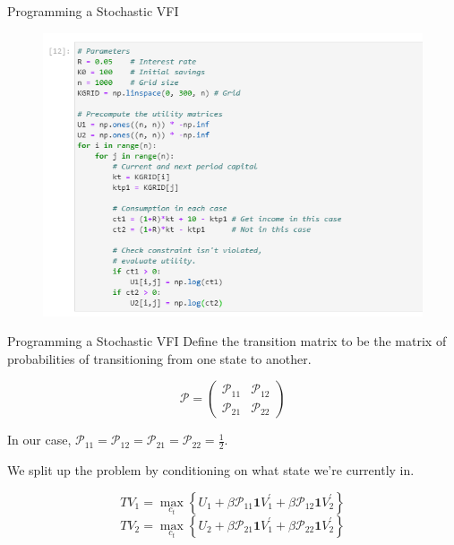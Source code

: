 \documentclass[11pt, xcolor={dvipsnames}, hyperref={colorlinks, allcolors=Blue}]{beamer}
\begin{document}
\begin{frame}{Programming a Stochastic VFI}

\begin{figure}
	\includegraphics[height=0.8\paperheight]{Code5.png}
	\hfill
\end{figure}

\end{frame}

\begin{frame}{Programming a Stochastic VFI}
Define the transition matrix to be the matrix of probabilities of transitioning from one state to another.

\[\mathcal{P} = \begin{pmatrix}\mathcal{P}_{11} & \mathcal{P}_{12}\\ \mathcal{P}_{21} & \mathcal{P}_{22} \end{pmatrix}\]
\bigskip

In our case, $\mathcal{P}_{11} = \mathcal{P}_{12} = \mathcal{P}_{21} = \mathcal{P}_{22} = \frac{1}{2}$. \bigskip

We split up the problem by conditioning on what state we're currently in. \bigskip

\[TV_{1} = \underset{c_{t}}{\max} \left \{  U_{1} + \beta \mathcal{P}_{11} \mathbf{1}V_{1}^{\prime} + \beta \mathcal{P}_{12} \mathbf{1}V_{2}^{\prime}  \right\} \]
\[TV_{2} = \underset{c_{t}}{\max} \left \{  U_{2} + \beta \mathcal{P}_{21} \mathbf{1}V_{1}^{\prime} + \beta \mathcal{P}_{22} \mathbf{1}V_{2}^{\prime}  \right\} \]

\end{frame}
\end{document}
